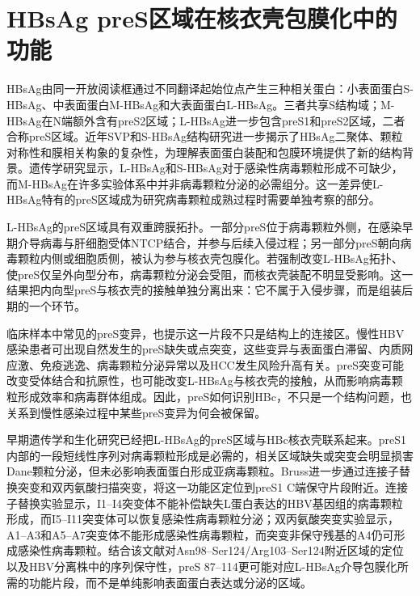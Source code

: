 \section{HBsAg preS区域在核衣壳包膜化中的功能}

HBsAg由同一开放阅读框通过不同翻译起始位点产生三种相关蛋白：小表面蛋白S-HBsAg、中表面蛋白M-HBsAg和大表面蛋白L-HBsAg\cite{seitz2020envelope}。三者共享S结构域；M-HBsAg在N端额外含有preS2区域；L-HBsAg进一步包含preS1和preS2区域，二者合称preS区域。近年SVP和S-HBsAg结构研究进一步揭示了HBsAg二聚体、颗粒对称性和膜相关构象的复杂性，为理解表面蛋白装配和包膜环境提供了新的结构背景\cite{liu2022cryo,wang2024inherent,he2025structure,bell2025surface}。遗传学研究显示，L-HBsAg和S-HBsAg对于感染性病毒颗粒形成不可缺少，而M-HBsAg在许多实验体系中并非病毒颗粒分泌的必需组分\cite{bruss1991role,ni2010pres2}。这一差异使L-HBsAg特有的preS区域成为研究病毒颗粒成熟过程时需要单独考察的部分。

L-HBsAg的preS区域具有双重跨膜拓扑。一部分preS位于病毒颗粒外侧，在感染早期介导病毒与肝细胞受体NTCP结合，并参与后续入侵过程\cite{yan2012ntcp,asami2024structural,kobayashi2026multistep}；另一部分preS朝向病毒颗粒内侧或细胞质侧，被认为参与核衣壳包膜化。若强制改变L-HBsAg拓扑、使preS仅呈外向型分布，病毒颗粒分泌会受阻，而核衣壳装配不明显受影响\cite{bruss1995functions,seitz2020envelope}。这一结果把内向型preS与核衣壳的接触单独分离出来：它不属于入侵步骤，而是组装后期的一个环节。

临床样本中常见的preS变异，也提示这一片段不只是结构上的连接区。慢性HBV感染患者可出现自然发生的preS缺失或点突变，这些变异与表面蛋白滞留、内质网应激、免疫逃逸、病毒颗粒分泌异常以及HCC发生风险升高有关\cite{lin2020association,peiffer2018divergent}。preS突变可能改变受体结合和抗原性，也可能改变L-HBsAg与核衣壳的接触，从而影响病毒颗粒形成效率和病毒群体组成。因此，preS如何识别HBc，不只是一个结构问题，也关系到慢性感染过程中某些preS变异为何会被保留。

早期遗传学和生化研究已经把L-HBsAg的preS区域与HBc核衣壳联系起来。preS1内部的一段短线性序列对病毒颗粒形成是必需的，相关区域缺失或突变会明显损害Dane颗粒分泌，但未必影响表面蛋白形成亚病毒颗粒\cite{bruss1995functions,bruss1997short}。Bruss进一步通过连接子替换突变和双丙氨酸扫描突变，将这一功能区定位到preS1 C端保守片段附近。连接子替换实验显示，I1--I4突变体不能补偿缺失L蛋白表达的HBV基因组的病毒颗粒形成，而I5--I11突变体可以恢复感染性病毒颗粒分泌；双丙氨酸突变实验显示，A1--A3和A5--A7突变体不能形成感染性病毒颗粒，而突变非保守残基的A4仍可形成感染性病毒颗粒\cite{bruss1997short}。结合该文献对Asn98--Ser124/Arg103--Ser124附近区域的定位以及HBV分离株中的序列保守性，preS 87--114更可能对应L-HBsAg介导包膜化所需的功能片段，而不是单纯影响表面蛋白表达或分泌的区域。


